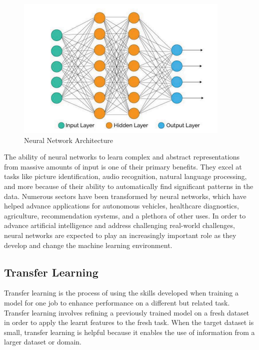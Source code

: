 \documentclass[a4paper,12pt]{report}%
\renewcommand{\\}{\vspace*{0.5\baselineskip} \newline}
\begin{document}
\begin{figure}[h]
\centering
	\includegraphics[scale=1.25]{images/neural network architecture.png}\\
	\begin{footnotesize}
		\caption{Neural Network Architecture\cite{11}}
		\label{Neural Network Architecture}
	\end{footnotesize}
\end{figure}

\noindent The ability of neural networks to learn complex and abstract representations from massive amounts of input is one of their primary benefits. They excel at tasks like picture identification, audio recognition, natural language processing, and more because of their ability to automatically find significant patterns in the data. Numerous sectors have been transformed by neural networks, which have helped advance applications for autonomous vehicles, healthcare diagnostics, agriculture, recommendation systems, and a plethora of other uses.
In order to advance artificial intelligence and address challenging real-world challenges, neural networks are expected to play an increasingly important role as they develop and change the machine learning environment.


\subsection{Transfer Learning}
Transfer learning is the process of using the skills developed when training a model for one job to enhance performance on a different but related task. Transfer learning involves refining a previously trained model on a fresh dataset in order to apply the learnt features to the fresh task. When the target dataset is small, transfer learning is helpful because it enables the use of information from a larger dataset or domain.
\bigskip
\bigskip
\end{document}
